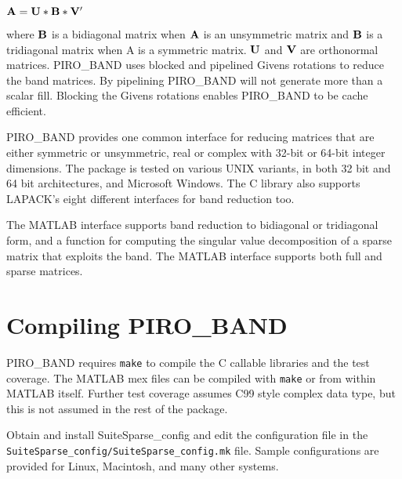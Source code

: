 \documentclass[11pt]{article}
\newcommand{\m}[1]{{\bf{#1}}}       %
\begin{document}
\begin{center} $\m{A} = \m{U} * \m{B} * \m{V'}$ \end{center}

where $\m{B}$ is a bidiagonal matrix when $\m{A}$ is an unsymmetric matrix and
$\m{B}$ is a tridiagonal matrix when A is a symmetric matrix. $\m{U}$ and
$\m{V}$ are orthonormal matrices. PIRO\_BAND uses blocked and pipelined Givens
rotations to reduce the band matrices. By pipelining PIRO\_BAND will not
generate more than a scalar fill.  Blocking the Givens rotations enables
PIRO\_BAND to be cache efficient.

PIRO\_BAND provides one common interface for reducing matrices that are either
symmetric or unsymmetric, real or complex with 32-bit or 64-bit integer
dimensions. The package is tested on various UNIX variants, in both 32 bit and
64 bit architectures, and Microsoft Windows. The C library also supports
LAPACK's eight different interfaces for band reduction too. 

The MATLAB interface supports band reduction to bidiagonal or tridiagonal form,
and a function for computing the singular value decomposition of a sparse
matrix that exploits the band.  The MATLAB interface supports both full and
sparse matrices.

\newpage \section{Compiling PIRO\_BAND}

PIRO\_BAND requires {\tt make} to compile the C callable libraries and the test
coverage. The MATLAB mex files can be compiled with {\tt make} or from within
MATLAB itself.  Further test coverage assumes C99 style complex data type,
but this is not assumed in the rest of the package.

Obtain and install SuiteSparse\_config and edit the configuration file in the
{\tt SuiteSparse\_config/SuiteSparse\_config.mk} file.  Sample configurations
are provided for Linux, Macintosh, and many other systems.
\end{document}
